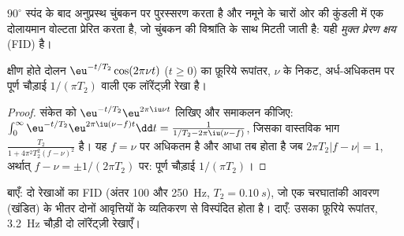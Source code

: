 \begin{definition}[मुक्त प्रेरण क्षय]\label{def:b3:advanced-nmr:fid}
$90^\circ$ स्पंद के बाद अनुप्रस्थ चुंबकन  पर पुरस्सरण करता है
और नमूने के चारों ओर की कुंडली में एक दोलायमान वोल्टता प्रेरित करता है,
जो चुंबकन की विश्रांति के साथ मिटती जाती है: यही \emph{मुक्त प्रेरण
क्षय} (FID) है।
\end{definition}

\begin{theorem}[FID से स्पेक्ट्रम तक]\label{thm:b3:advanced-nmr:lorentzian}
क्षीण होते दोलन $\eu^{-t/T_2}\cos(2\pi\nu t)$ ($t \ge 0$) का फ़ूरिये रूपांतर,
$\nu$ के निकट, अर्ध-अधिकतम पर पूर्ण चौड़ाई $1/(\pi T_2)$ वाली एक लॉरेंट्ज़ी रेखा है।
\end{theorem}

\begin{proof}
संकेत को $\eu^{-t/T_2}\eu^{2\pi\iu\nu t}$ लिखिए और समाकलन कीजिए:
$\int_0^\infty\eu^{-t/T_2}\eu^{2\pi\iu(\nu - f)t}\dd t = \frac{1}{1/T_2 - 2\pi\iu(\nu - f)}$, जिसका वास्तविक
भाग $\frac{T_2}{1 + 4\pi^2T_2^2(f - \nu)^2}$ है। यह $f = \nu$ पर अधिकतम है और
आधा तब होता है जब $2\pi T_2|f - \nu| = 1$, अर्थात् $f - \nu = \pm1/(2\pi T_2)$ पर: पूर्ण चौड़ाई
$1/(\pi T_2)$।
\end{proof}

\begin{omfigure}

{\small बाएँ: दो रेखाओं का FID (अंतर 100 और \qty{250}{Hz}, $T_2 = \qty{0.10}{s}$),
जो एक चरघातांकी आवरण (खंडित) के भीतर दोनों आवृत्तियों के व्यतिकरण से विस्पंदित होता है।
दाएँ: उसका फ़ूरिये रूपांतर, \qty{3.2}{Hz} चौड़ी दो लॉरेंट्ज़ी रेखाएँ।}
\end{omfigure}

